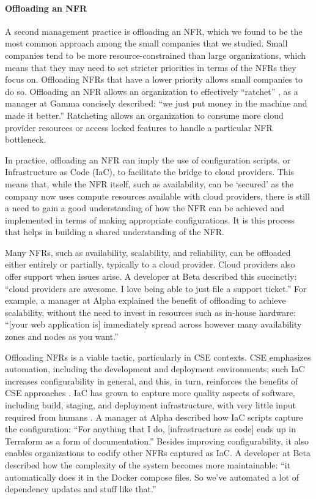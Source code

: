 \documentclass[smallextended]{svjour3}
\begin{document}
\paragraph{Offloading an NFR} A second management practice is offloading an NFR, which we found to be the most common approach among the small companies that we studied. 
Small companies tend to be more resource-constrained than large organizations, which means that they may need to set stricter priorities in terms of the NFRs they focus on. Offloading NFRs that have a lower priority allows small companies to do so. 
Offloading an NFR allows an organization to effectively ``ratchet'' \citep{bellomo2014}, as a manager at Gamma concisely described: \textmd{``we just put money in the machine and made it better.''}
Ratcheting allows an organization to consume more cloud provider resources or access locked features to handle a particular NFR bottleneck.

In practice, offloading an NFR can imply the use of configuration scripts, or Infrastructure as Code (IaC), to facilitate the bridge to cloud providers. This means that, while the NFR itself, such as availability, can be `secured' as the company now uses compute resources available with cloud providers, there is still a need to gain a good understanding of how the NFR can be achieved and implemented in terms of making appropriate configurations. It is this process that helps in building a shared understanding of the NFR. 


Many NFRs, such as availability, scalability, and reliability, can be offloaded either entirely or partially, typically to a cloud provider.  
Cloud providers also offer support when issues arise. A developer at Beta described this succinctly: \textmd{``cloud providers are awesome. I love being able to just file a support ticket.''}
For example, a manager at Alpha explained the benefit of offloading to achieve scalability, without the need to invest in resources such as in-house hardware:
\textmd{``[your web application is] immediately spread across however many availability zones and nodes as you want.''}



Offloading NFRs is a viable tactic, particularly in CSE contexts. CSE emphasizes automation, including the development and deployment environments; such IaC increases configurability in general, and this, in turn, reinforces the benefits of CSE approaches \citep{humble2010continuous}.
IaC has grown to capture more quality aspects of software, including build, staging, and deployment infrastructure, with very little input required from humans \citep{humble2018accelerate}.
A manager at Alpha described how IaC scripts capture the configuration:
\textmd{``For anything that I do, [infrastructure as code] ends up in Terraform as a form of documentation.''} 
Besides improving configurability, it also enables organizations to codify other NFRs captured as IaC. 
A developer at Beta described how the complexity of the system becomes more maintainable:
\textmd{``it automatically does it in the Docker compose files. So we've automated a lot of dependency updates and stuff like that.''}
\end{document}
